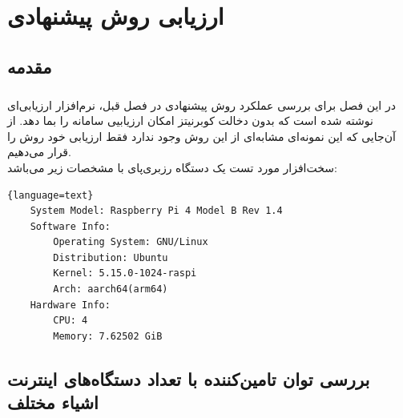 
\chapter{ارزیابی روش پیشنهادی} \label{ch:eval}
\thispagestyle{empty}


\section{مقدمه}
\paragraph{}{
    در این فصل برای بررسی عملکرد روش پیشنهادی در فصل قبل، نرم‌افزار ارزیابی‌ای نوشته شده است که بدون دخالت کوبرنیتز امکان ارزیابیی سامانه را بما دهد.
    از آن‌جایی که این نمونه‌ای مشابه‌ای از این روش وجود ندارد فقط ارزیابی خود روش را قرار می‌دهیم.
    \\
    سخت‌افزار مورد تست یک دستگاه رزبری‌پای با مشخصات زیر می‌باشد:
    \begin{latin}
        \begin{lstlisting}{language=text}
    System Model: Raspberry Pi 4 Model B Rev 1.4
    Software Info:
        Operating System: GNU/Linux
        Distribution: Ubuntu
        Kernel: 5.15.0-1024-raspi
        Arch: aarch64(arm64)
    Hardware Info:
        CPU: 4
        Memory: 7.62502 GiB
        \end{lstlisting}
    \end{latin}
    \newpage
}

\section{
    بررسی توان تامین‌کننده با تعداد دستگاه‌های اینترنت اشیاء مختلف
}
\label{sec:different_devices}
